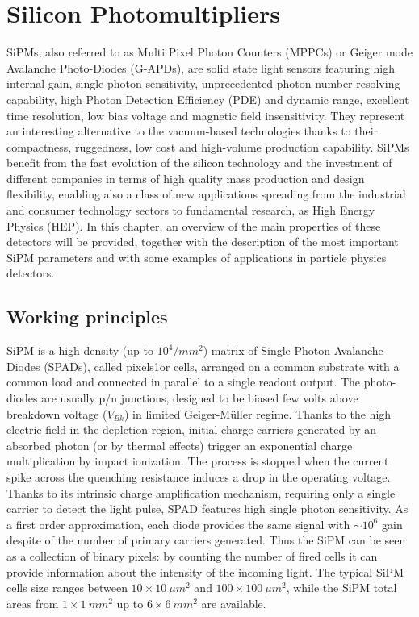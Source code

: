 \chapter{Silicon Photomultipliers}
SiPMs, also referred to as Multi Pixel Photon Counters (MPPCs) or Geiger mode Avalanche Photo-Diodes (G-APDs), are solid state light sensors featuring high internal gain, single-photon sensitivity, unprecedented photon number resolving capability, high Photon Detection Efficiency (PDE) and dynamic range, excellent time resolution, low bias voltage and magnetic field insensitivity. They represent an interesting alternative to the vacuum-based technologies thanks to their compactness, ruggedness, low cost and high-volume production capability. SiPMs benefit from the fast evolution of the silicon technology and the investment of different companies in terms of high quality mass production and design flexibility, enabling also a class of new applications spreading from the industrial and consumer technology sectors to fundamental research,  as High Energy Physics (HEP).  In this chapter, an overview of the main properties of these detectors will be provided, together with the description of the most important SiPM parameters and with some examples of applications in particle physics detectors.

\section{Working principles}\label{subsec:SiPM_work}
SiPM is a high density (up to $10^4/mm^2$) matrix of Single-Photon Avalanche Diodes (SPADs), called pixels1or cells, arranged on a common substrate with a common load and connected in parallel to a single readout output.   The photo-diodes are usually p/n junctions, designed to be biased few volts above breakdown voltage ($V_{Bk}$) in limited Geiger-Müller regime. Thanks to the high electric field in the depletion region, initial charge carriers generated by an absorbed photon (or by thermal effects) trigger an exponential charge multiplication by impact ionization. The process is stopped when the current spike across the quenching resistance induces a drop in the operating voltage. Thanks to its intrinsic charge amplification mechanism, requiring only a single carrier to detect the light pulse,  SPAD features high single photon sensitivity. As a first order approximation, each diode provides the same signal with $\sim 10^6$ gain despite of the number of primary carriers generated.   Thus the SiPM can be seen as a collection of binary pixels: by counting the number of fired cells it can provide information about the intensity of the incoming light.  The typical SiPM cells size ranges between $10\times 10\ \mu m^2$ and $100\times 100\ \mu m^2$, while the SiPM total areas from $1\times 1\ mm^2$ up to $6\times 6\ mm^2$ are available.


